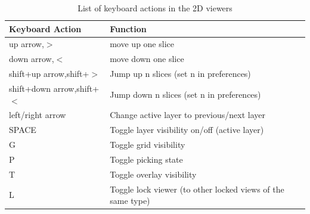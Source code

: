 \documentclass[fleqn,11pt,openany]{book}
\begin{document}
\begin{table}[h!]
\label{tab:2dkey}
\caption{List of keyboard actions in the 2D viewers}
\begin{tabular}{|l|l|}
\hline
{\bf Keyboard Action} & {\bf Function}\\
\hline
up arrow,$>$ & move up one slice\\
down arrow,$<$ & move down one slice\\
\hline
shift+up arrow,shift+$>$ & Jump up n slices (set n in preferences)\\
shift+down arrow,shift+$<$ & Jump down n slices (set n in preferences)\\
\hline
left/right arrow & Change active layer to previous/next layer\\
\hline
SPACE & Toggle layer visibility on/off (active layer)\\
\hline
G & Toggle grid visibility\\
\hline
P & Toggle picking state\\
\hline
T & Toggle overlay visibility\\
\hline
L & Toggle lock viewer (to other locked views of the same type)\\
\hline
\end{tabular}
\end{table}
\end{document}
